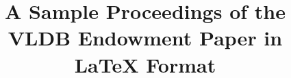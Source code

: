 \documentclass{vldb}
\begin{document}

\title{A Sample {\ttlit Proceedings of the VLDB Endowment} Paper in LaTeX
Format}



%
%
%
%

\end{document}
